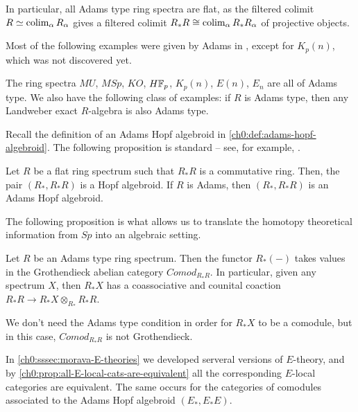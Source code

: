 In particular, all Adams type ring spectra are flat, as the filtered colimit $R\simeq \operatorname{colim}_\alpha R_\alpha$ gives a filtered colimit $R_*R\cong \operatorname{colim}_\alpha R_*R_\alpha$ of projective objects. 

Most of the following examples were given by Adams in \cite[III.13.4]{adams_74}, except for $K_p(n)$, which was not discovered yet. 

\begin{example}
    The ring spectra $MU$, $MSp$, $KO$, $H\mathbb{F}_p$, $K_p(n)$, $E(n)$, $E_n$ are all of Adams type. We also have the following class of examples: if $R$ is Adams type, then any Landweber exact $R$-algebra is also Adams type. 
\end{example}

Recall the definition of an Adams Hopf algebroid in \cref{ch0:def:adams-hopf-algebroid}. The following proposition is standard -- see, for example, \cite[1.4.6]{hovey_04}. 

\begin{proposition}
    \label{ch0:prop:hopf-algebroid-from-spectra}
    Let $R$ be a flat ring spectrum such that $R_*R$ is a commutative ring. Then, the pair $(R_*, R_*R)$ is a Hopf algebroid. If $R$ is Adams, then $(R_*, R_*R)$ is an Adams Hopf algebroid. 
\end{proposition}

The following proposition is what allows us to translate the homotopy theoretical information from $Sp$ into an algebraic setting. 

\begin{proposition}
    \label{ch0:prop:R-homology-values-in-comodules}
    Let $R$ be an Adams type ring spectrum. Then the functor $R_*(-)$ takes values in the Grothendieck abelian category $Comod_{R_*R}$. In particular, given any spectrum $X$, then $R_*X$ has a coassociative and counital coaction $R_*R\longrightarrow R_*X\otimes_{R_*}R_*R$. 
\end{proposition}

\begin{remark}
    We don't need the Adams type condition in order for $R_*X$ to be a comodule, but in this case, $Comod_{R_*R}$ is not Grothendieck. 
\end{remark}

In \cref{ch0:sssec:morava-E-theories} we developed serveral versions of $E$-theory, and by \cref{ch0:prop:all-E-local-cats-are-equivalent} all the corresponding $E$-local categories are equivalent. The same occurs for the categories of comodules associated to the Adams Hopf algebroid $(E_*, E_*E)$.

